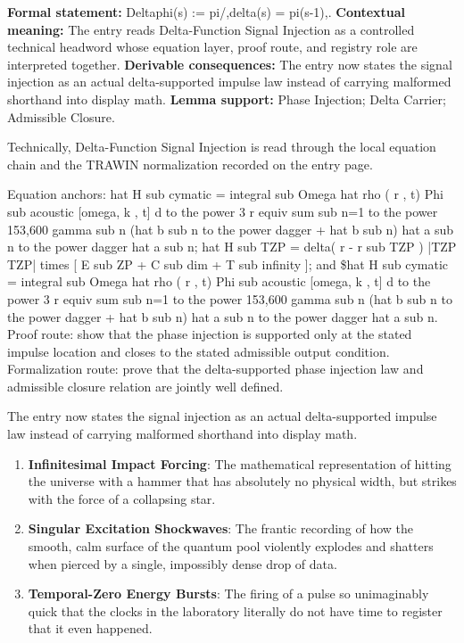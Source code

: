 \begingroup\footnotesize\setlength{\emergencystretch}{3em}\sloppy
\textbf{Formal statement:} Deltaphi(s) := pi/,delta(s) = pi(s-1),. \textbf{Contextual meaning:} The entry reads Delta-Function Signal Injection as a controlled technical headword whose equation layer, proof route, and registry role are interpreted together. \textbf{Derivable consequences:} The entry now states the signal injection as an actual delta-supported impulse law instead of carrying malformed shorthand into display math. \textbf{Lemma support:} Phase Injection; Delta Carrier; Admissible Closure.\par
\endgroup

Technically, Delta-Function Signal Injection is read through the local equation chain and the TRAWIN normalization recorded on the entry page.

Equation anchors: hat H sub cymatic = integral sub Omega hat rho ( r , t) Phi sub acoustic [omega, k , t] d to the power 3 r equiv sum sub n=1 to the power 153,600 gamma sub n (hat b sub n to the power dagger + hat b sub n) hat a sub n to the power dagger hat a sub n; hat H sub TZP = delta( r - r sub TZP ) |TZP TZP| times [ E sub ZP + C sub dim + T sub infinity ]; and \$hat H sub cymatic = integral sub Omega hat rho ( r , t) Phi sub acoustic [omega, k , t] d to the power 3 r equiv sum sub n=1 to the power 153,600 gamma sub n (hat b sub n to the power dagger + hat b sub n) hat a sub n to the power dagger hat a sub n. Proof route: show that the phase injection is supported only at the stated impulse location and closes to the stated admissible output condition. Formalization route: prove that the delta-supported phase injection law and admissible closure relation are jointly well defined.

The entry now states the signal injection as an actual delta-supported impulse law instead of carrying malformed shorthand into display math.
\endgroup

\begin{enumerate}[leftmargin=1.6em,itemsep=6pt,topsep=4pt]
\item \textbf{Infinitesimal Impact Forcing}: The mathematical representation of hitting the universe with a hammer that has absolutely no physical width, but strikes with the force of a collapsing star.
\item \textbf{Singular Excitation Shockwaves}: The frantic recording of how the smooth, calm surface of the quantum pool violently explodes and shatters when pierced by a single, impossibly dense drop of data.
\item \textbf{Temporal-Zero Energy Bursts}: The firing of a pulse so unimaginably quick that the clocks in the laboratory literally do not have time to register that it even happened.
\end{enumerate}

